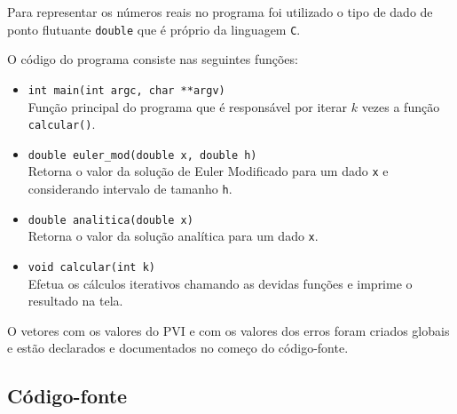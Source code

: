 Para representar os números reais no programa foi utilizado o tipo de dado de ponto flutuante \texttt{double} que é próprio da linguagem \texttt{C}.

O código do programa consiste nas seguintes funções:
\begin{itemize}
	\item \verb|int main(int argc, char **argv)|\\
	Função principal do programa que é responsável por iterar $k$ vezes a função \texttt{calcular()}.

	\item \verb|double euler_mod(double x, double h)|\\
	Retorna o valor da solução de Euler Modificado para um dado \texttt{x} e considerando intervalo de tamanho \texttt{h}.
	
	\item \verb|double analitica(double x)|\\
	Retorna o valor da solução analítica para um dado \texttt{x}.

	\item \verb|void calcular(int k)|\\
	Efetua os cálculos iterativos chamando as devidas funções e imprime o resultado na tela.
\end{itemize}

O vetores com os valores do PVI e com os valores dos erros foram criados globais e estão declarados e documentados
no começo do código-fonte.

\subsection{Código-fonte}

